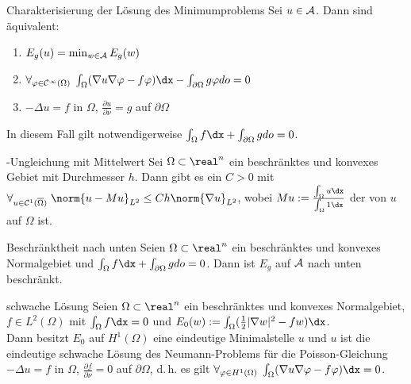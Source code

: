 \linie

\begin{Satz}{Charakterisierung der Lösung des Minimumproblems}
    Sei $u \in \mathcal{A}$.
    Dann sind äquivalent:
    \begin{enumerate}
        \item
        $E_g(u) = \min_{w \in \mathcal{A}} E_g(w)$

        \item
        $\forall_{\varphi \in \C^\infty(\Omega)}\;
        \int_\Omega (\nabla u \nabla \varphi - f \varphi)\dx -
        \int_{\partial\Omega} g\varphi do = 0$

        \item
        $-\Delta u = f$ in $\Omega$, $\frac{\partial u}{\partial\nu} = g$ auf $\partial\Omega$
    \end{enumerate}
    In diesem Fall gilt notwendigerweise $\int_\Omega f\dx + \int_{\partial\Omega} g do = 0$.
\end{Satz}

\linie

\begin{Satz}{-Ungleichung mit Mittelwert}
    Sei $\Omega \subset \real^n$ ein beschränktes und konvexes Gebiet mit Durchmesser $h$.
    Dann gibt es ein $C > 0$ mit $\forall_{u \in \C^1(\overline{\Omega})}\;
    \norm{u - Mu}_{L^2} \le Ch \norm{\nabla u}_{L^2}$,
    wobei $Mu := \frac{\int_\Omega u\dx}{\int_\Omega 1\dx}$
    der  von $u$ auf $\Omega$ ist.
\end{Satz}

\begin{Satz}{Beschränktheit nach unten}
    Seien $\Omega \subset \real^n$ ein beschränktes und konvexes Normalgebiet
    und $\int_\Omega f\dx + \int_{\partial\Omega} g do = 0$.
    Dann ist $E_g$ auf $\mathcal{A}$ nach unten beschränkt.
\end{Satz}

\linie

\begin{Satz}{schwache Lösung}
    Seien $\Omega \subset \real^n$ ein beschränktes und konvexes Normalgebiet,\\
    $f \in L^2(\Omega)$ mit $\int_\Omega f\dx = 0$ und
    $E_0(w) := \int_\Omega (\frac{1}{2} |\nabla w|^2 - fw)\dx$.\\
    Dann besitzt $E_0$ auf $H^1(\Omega)$ eine eindeutige Minimalstelle $u$ und $u$ ist die
    eindeutige schwache Lösung des Neumann-Problems für die Poisson-Gleichung
    $-\Delta u = f$ in $\Omega$,
    $\frac{\partial f}{\partial\nu} = 0$ auf $\partial\Omega$, d.\,h. es gilt
    $\forall_{\varphi \in H^1(\Omega)}\; \int_\Omega (\nabla u \nabla \varphi - f\varphi)\dx = 0$.
\end{Satz}

